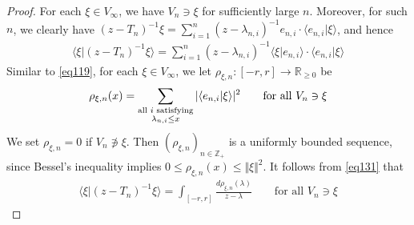\documentclass[12pt,b5paper,notitlepage]{article}
\theoremstyle{definition}
\theoremstyle{plain}
\newcommand{\bk}[1]{\langle {#1}\rangle}
\newcommand{\Zbb}{\mathbb Z}
\newcommand{\Rbb}{\mathbb R}
\numberwithin{equation}{section}
\begin{document}
\begin{proof}
For each $\xi\in V_\infty$, we have $V_n\ni\xi$ for sufficiently large $n$. Moreover, for such $n$, we clearly have $(z-T_n)^{-1}\xi=\sum_{i=1}^n(z-\lambda_{n,i})^{-1}e_{n,i}\cdot\bk{e_{n,i}|\xi}$, and hence
\begin{align}\label{eq131}
\bk{\xi|(z-T_n)^{-1}\xi}=\sum_{i=1}^n (z-\lambda_{n,i})^{-1}\bk{\xi|e_{n,i}}\cdot \bk{e_{n,i}|\xi}
\end{align}
Similar to \eqref{eq119}, for each $\xi\in V_\infty$, we let $\rho_{\xi,n}:[-r,r]\rightarrow\Rbb_{\geq0}$ be
\begin{align}
\rho_{\xi,n}(x)=\sum_{
\begin{subarray}{c}
\text{all $i$ satisfying}\\
\lambda_{n,i}\leq x
\end{subarray}
}|\bk{e_{n,i}|\xi}|^2
\qquad\text{for all }V_n\ni\xi
\end{align}
We set $\rho_{\xi,n}=0$ if $V_n\notni\xi$. Then $(\rho_{\xi,n})_{n\in\Zbb_+}$ is a uniformly bounded sequence, since Bessel's inequality implies $0\leq\rho_{\xi,n}(x)\leq\Vert\xi\Vert^2$. It follows from \eqref{eq131} that
\begin{align*}
\bk{\xi|(z-T_n)^{-1}\xi}=\int_{[-r,r]}\frac{d\rho_{\xi,n}(\lambda)}{z-\lambda}\qquad\text{for all }V_n\ni\xi
\end{align*}





\end{proof}
\end{document}
